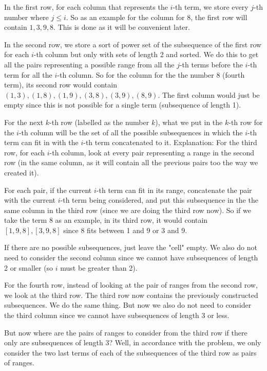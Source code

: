 \documentclass[11pt,letterpaper]{article}
\begin{document}
		In the first row, for each column that represents the $i$-th term, we store every $j$-th number where $j \le i$.
		So as an example for the column for 8, the first row will contain $1,3,9,8$.
		This is done as it will be convenient later.
		
		In the second row, we store a sort of power set of the subsequence of the first row for each $i$-th column but only with sets of length 2 and sorted.
		We do this to get all the pairs representing a possible range from all the $j$-th terms before the $i$-th term for all the $i$-th column.
		So for the column for the the number 8 (fourth term), its second row would contain $(1,3), (1,8), (1,9), (3,8), (3,9), (8,9)$.
		The first column would just be empty since this is not possible for a single term (subsequence of length 1).
		
		For the next $k$-th row (labelled as the number $k$), what we put in the $k$-th row for the $i$-th column will be the set of all the possible subsequences in which the $i$-th term can fit in with the $i$-th term concatenated to it.
		\newline\newline
		Explanation:
		\newline\newline
		For the third row, for each $i$-th column, look at every pair representing a range in the second row (in the same column, as it will contain all the previous pairs too the way we created it).
		
		For each pair, if the current $i$-th term can fit in its range, concatenate the pair with the current $i$-th term being considered, and put this subsequence in the the same column in the third row (since we are doing the third row now).
		So if we take the term 8 as an example, in its third row, it would contain $[1,9,8], [3,9,8]$ since 8 fits between 1 and 9 or 3 and 9.
		
		If there are no possible subsequences, just leave the "cell" empty.
		We also do not need to consider the second column since we cannot have subsequences of length 2 or smaller (so $i$ must be greater than 2).
		
		For the fourth row, instead of looking at the pair of ranges from the second row, we look at the third row.
		The third row now contains the previously constructed subsequences.
		We do the same thing.
		But now we also do not need to consider the third column since we cannot have subsequences of length 3 or less.
		
		But now where are the pairs of ranges to consider from the third row if there only are subsequences of length 3?
		Well, in accordance with the problem, we only consider the two last terms of each of the subsequences of the third row as pairs of ranges.
		
\end{document}
